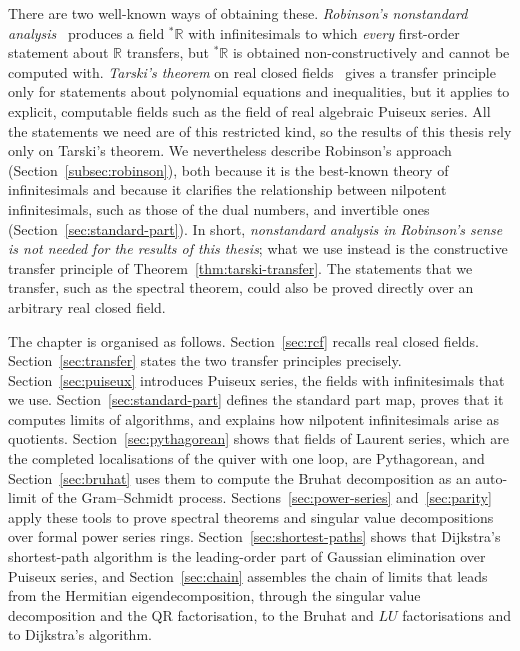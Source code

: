 \documentclass[12pt, a4paper]{report}
\theoremstyle{plain}
\theoremstyle{definition}
\theoremstyle{remark}
\theoremstyle{plain}
\newcommand{\RR}{\mathbb{R}}
\begin{document}
There are two well-known ways of obtaining these. \emph{Robinson's nonstandard analysis}~\cite{Robinson1966} produces a field ${}^*\RR$ with infinitesimals to which \emph{every} first-order statement about $\RR$ transfers, but ${}^*\RR$ is obtained non-constructively and cannot be computed with. \emph{Tarski's theorem} on real closed fields~\cite{Tarski1951} gives a transfer principle only for statements about polynomial equations and inequalities, but it applies to explicit, computable fields such as the field of real algebraic Puiseux series. All the statements we need are of this restricted kind, so the results of this thesis rely only on Tarski's theorem. We nevertheless describe Robinson's approach (Section~\ref{subsec:robinson}), both because it is the best-known theory of infinitesimals and because it clarifies the relationship between nilpotent infinitesimals, such as those of the dual numbers, and invertible ones (Section~\ref{sec:standard-part}). In short, \emph{nonstandard analysis in Robinson's sense is not needed for the results of this thesis}; what we use instead is the constructive transfer principle of Theorem~\ref{thm:tarski-transfer}. The statements that we transfer, such as the spectral theorem, could also be proved directly over an arbitrary real closed field.

The chapter is organised as follows. Section~\ref{sec:rcf} recalls real closed fields. Section~\ref{sec:transfer} states the two transfer principles precisely. Section~\ref{sec:puiseux} introduces Puiseux series, the fields with infinitesimals that we use. Section~\ref{sec:standard-part} defines the standard part map, proves that it computes limits of algorithms, and explains how nilpotent infinitesimals arise as quotients. Section~\ref{sec:pythagorean} shows that fields of Laurent series, which are the completed localisations of the quiver with one loop, are Pythagorean, and Section~\ref{sec:bruhat} uses them to compute the Bruhat decomposition as an auto-limit of the Gram--Schmidt process. Sections~\ref{sec:power-series} and~\ref{sec:parity} apply these tools to prove spectral theorems and singular value decompositions over formal power series rings. Section~\ref{sec:shortest-paths} shows that Dijkstra's shortest-path algorithm is the leading-order part of Gaussian elimination over Puiseux series, and Section~\ref{sec:chain} assembles the chain of limits that leads from the Hermitian eigendecomposition, through the singular value decomposition and the QR factorisation, to the Bruhat and $LU$ factorisations and to Dijkstra's algorithm.
\end{document}
